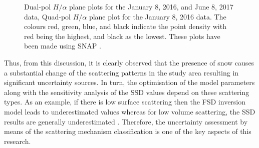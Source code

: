 \documentclass[12pt]{elsarticle}
\numberwithin{equation}{section}
\numberwithin{figure}{section}
\numberwithin{table}{section}
\begin{document}
\begin{figure}[htb]
\begin{subfigure}[t]{0.49\textwidth}
        \caption{}
        \label{subfig:ha_jan_quad}
    \end{subfigure}
    \caption{Dual-pol $H/{\alpha}$ plane plots for the  January 8, 2016, and  June 8, 2017 data,  Quad-pol $H/{\alpha}$ plane plot for the January 8, 2016 data. The colours red, green, blue, and black indicate the point density with red being the highest, and black as the lowest. These plots have been made using SNAP \citep{ESA2019}.}
    \label{fig:ha_res}
\end{figure}

Thus, from this discussion, it is clearly observed that the presence of snow causes a substantial change of the scattering patterns in the study area resulting in significant uncertainty sources. In turn, the optimisation of the model parameters along with the sensitivity analysis of the SSD values depend on these scattering types. As an example, if there is low surface scattering then the FSD inversion model leads to underestimated values \citep{Leinss2014} whereas for low volume scattering, the SSD results are generally underestimated \citep{Cloude2005, Hajnsek2009, Kugler2015}. Therefore, the uncertainty assessment by means of the scattering mechanism classification is one of the key aspects of this research.
\FloatBarrier
\end{document}

